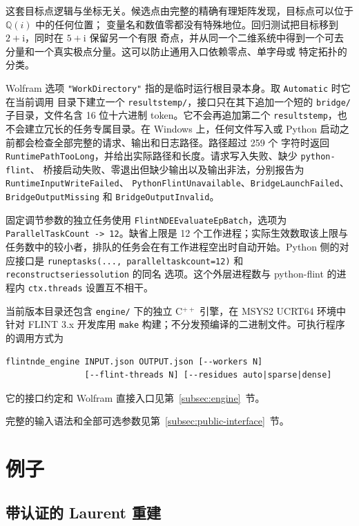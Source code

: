 \documentclass[11pt,a4paper]{ctexart}
\renewcommand{\_}{\origunderscore\allowbreak}
\begin{document}
这套目标点逻辑与坐标无关。候选点由完整的精确有理矩阵发现，目标点可以位于 $\mathbb Q(i)$ 中的任何位置；
变量名和数值零都没有特殊地位。回归测试把目标移到 $2+\mathrm{i}$，同时在 $5+\mathrm{i}$ 保留另一个有限
奇点，并从同一个二维系统中得到一个可去分量和一个真实极点分量。这可以防止通用入口依赖零点、单字母或
特定拓扑的分类。

Wolfram 选项 \texttt{"WorkDirectory"} 指的是临时运行根目录本身。取 \texttt{Automatic} 时它在当前调用
目录下建立一个 \texttt{results\_temp/}，接口只在其下追加一个短的 \texttt{bridge/} 子目录，文件名含
16 位十六进制 token。它不会再追加第二个 \texttt{results\_temp}，也不会建立冗长的任务专属目录。在
Windows 上，任何文件写入或 Python 启动之前都会检查全部完整的请求、输出和日志路径。路径超过 259 个
字符时返回 \texttt{RuntimePathTooLong}，并给出实际路径和长度。请求写入失败、缺少 \texttt{python-flint}、
桥接启动失败、零退出但缺少输出以及输出非法，分别报告为 \texttt{RuntimeInputWriteFailed}、
\texttt{PythonFlintUnavailable}、\texttt{BridgeLaunchFailed}、\texttt{BridgeOutputMissing} 和
\texttt{BridgeOutputInvalid}。

固定调节参数的独立任务使用 \texttt{FlintNDE}\allowbreak\texttt{EvaluateEpBatch}，选项为
\texttt{Parallel}\allowbreak\texttt{TaskCount -> 12}。缺省上限是 12 个工作进程；实际生效数取该上限与
任务数中的较小者，排队的任务会在有工作进程空出时自动开始。Python 侧的对应接口是
\texttt{run\_ep\_tasks(..., parallel\_task\_count=12)} 和 \texttt{reconstruct\_series\_solution} 的同名
选项。这个外层进程数与 python-flint 的进程内 \texttt{ctx.threads} 设置互不相干。

当前版本目录还包含 \texttt{engine/} 下的独立 C$^{++}$ 引擎，在 MSYS2 UCRT64 环境中针对 FLINT 3.x
开发库用 \texttt{make} 构建；不分发预编译的二进制文件。可执行程序的调用方式为
\begin{verbatim}
flintnde_engine INPUT.json OUTPUT.json [--workers N]
                [--flint-threads N] [--residues auto|sparse|dense]
\end{verbatim}
它的接口约定和 Wolfram 直接入口见第~\ref{subsec:engine}~节。

完整的输入语法和全部可选参数见第~\ref{subsec:public-interface}~节。

\section{例子}
\label{sec:examples}

\subsection{带认证的 Laurent 重建}
\end{document}
